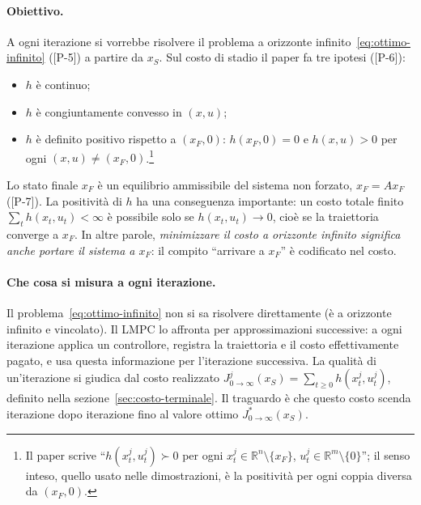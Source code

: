 \documentclass[11pt,a4paper]{article}
\theoremstyle{definition}
\theoremstyle{plain}
\theoremstyle{remark}
\newcommand{\R}{\mathbb{R}}
\newcommand{\Jstar}{J^{*}_{0\to\infty}}
\newcommand{\eqp}[1]{\textup{[P-#1]}}   %
\begin{document}
\paragraph{Obiettivo.}
A ogni iterazione si vorrebbe risolvere il problema a orizzonte
infinito~\eqref{eq:ottimo-infinito} (\eqp{5}) a partire da $x_S$. Sul costo di
stadio il paper fa tre ipotesi (\eqp{6}):
\begin{itemize}
  \item $h$ è continuo;
  \item $h$ è congiuntamente convesso in $(x,u)$;
  \item $h$ è definito positivo rispetto a $(x_F,0)$: $h(x_F,0)=0$ e
        $h(x,u)>0$ per ogni $(x,u)\ne(x_F,0)$.\footnote{Il paper scrive
        ``$h(x^j_t,u^j_t)\succ 0$ per ogni $x^j_t\in\R^n\setminus\{x_F\}$,
        $u^j_t\in\R^m\setminus\{0\}$''; il senso inteso, quello usato nelle
        dimostrazioni, è la positività per ogni coppia diversa da
        $(x_F,0)$.}
\end{itemize}
Lo stato finale $x_F$ è un equilibrio ammissibile del sistema non forzato,
$x_F=Ax_F$ (\eqp{7}). La positività di $h$ ha una conseguenza importante: un
costo totale finito $\sum_t h(x_t,u_t)<\infty$ è possibile solo se
$h(x_t,u_t)\to 0$, cioè se la traiettoria converge a $x_F$. In altre parole,
\emph{minimizzare il costo a orizzonte infinito significa anche portare il
sistema a $x_F$}: il compito ``arrivare a $x_F$'' è codificato nel costo.

\paragraph{Che cosa si misura a ogni iterazione.}
Il problema~\eqref{eq:ottimo-infinito} non si sa risolvere direttamente (è a
orizzonte infinito e vincolato). Il LMPC lo affronta per approssimazioni
successive: a ogni iterazione applica un controllore, registra la traiettoria
e il costo effettivamente pagato, e usa questa informazione per l'iterazione
successiva. La qualità di un'iterazione si giudica dal costo realizzato
$J^j_{0\to\infty}(x_S)=\sum_{t\ge 0}h(x^j_t,u^j_t)$, definito nella
sezione~\ref{sec:costo-terminale}. Il traguardo è che questo costo scenda
iterazione dopo iterazione fino al valore ottimo $\Jstar(x_S)$.
\end{document}
